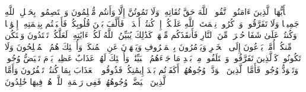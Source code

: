 \stopbuffer%
\startbuffer[\q:3:102]
یَٰۤأَیُّهَا ٱلَّذِینَ ءَامَنُوا۟ ٱتَّقُوا۟ ٱللَّهَ حَقَّ تُقَاتِهِۦ وَلَا تَمُوتُنَّ إِلَّا وَأَنتُم مُّسۡلِمُونَ%
\stopbuffer%
\startbuffer[\q:3:103]
وَٱعۡتَصِمُوا۟ بِحَبۡلِ ٱللَّهِ جَمِیعࣰا وَلَا تَفَرَّقُوا۟ۚ وَٱذۡكُرُوا۟ نِعۡمَتَ ٱللَّهِ عَلَیۡكُمۡ إِذۡ كُنتُمۡ أَعۡدَاۤءࣰ فَأَلَّفَ بَیۡنَ قُلُوبِكُمۡ فَأَصۡبَحۡتُم بِنِعۡمَتِهِۦۤ إِخۡوَٰنࣰا وَكُنتُمۡ عَلَىٰ شَفَا حُفۡرَةࣲ مِّنَ ٱلنَّارِ فَأَنقَذَكُم مِّنۡهَاۗ كَذَٰلِكَ یُبَیِّنُ ٱللَّهُ لَكُمۡ ءَایَٰتِهِۦ لَعَلَّكُمۡ تَهۡتَدُونَ%
\stopbuffer%
\startbuffer[\q:3:104]
وَلۡتَكُن مِّنكُمۡ أُمَّةࣱ یَدۡعُونَ إِلَى ٱلۡخَیۡرِ وَیَأۡمُرُونَ بِٱلۡمَعۡرُوفِ وَیَنۡهَوۡنَ عَنِ ٱلۡمُنكَرِۚ وَأُو۟لَٰۤئِكَ هُمُ ٱلۡمُفۡلِحُونَ%
\stopbuffer%
\startbuffer[\q:3:105]
وَلَا تَكُونُوا۟ كَٱلَّذِینَ تَفَرَّقُوا۟ وَٱخۡتَلَفُوا۟ مِنۢ بَعۡدِ مَا جَاۤءَهُمُ ٱلۡبَیِّنَٰتُۚ وَأُو۟لَٰۤئِكَ لَهُمۡ عَذَابٌ عَظِیمࣱ%
\stopbuffer%
\startbuffer[\q:3:106]
یَوۡمَ تَبۡیَضُّ وُجُوهࣱ وَتَسۡوَدُّ وُجُوهࣱۚ فَأَمَّا ٱلَّذِینَ ٱسۡوَدَّتۡ وُجُوهُهُمۡ أَكَفَرۡتُم بَعۡدَ إِیمَٰنِكُمۡ فَذُوقُوا۟ ٱلۡعَذَابَ بِمَا كُنتُمۡ تَكۡفُرُونَ%
\stopbuffer%
\startbuffer[\q:3:107]
وَأَمَّا ٱلَّذِینَ ٱبۡیَضَّتۡ وُجُوهُهُمۡ فَفِی رَحۡمَةِ ٱللَّهِۖ هُمۡ فِیهَا خَٰلِدُونَ%
\stopbuffer%
